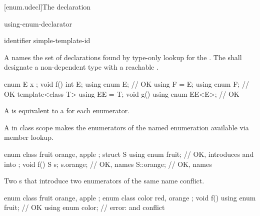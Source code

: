[enum.udecl]{The  declaration}%
%

\begin{bnf}
\br
      using-enum-declarator \terminal{;}
\end{bnf}

\begin{bnf}
\br
     identifier\br
     simple-template-id
\end{bnf}

\pnum
A 
names the set of declarations found by
type-only lookup
for the .
The 
shall designate a non-dependent type
with a reachable .
\begin{example}
\begin{codeblock}
enum E { x };
void f() {
  int E;
  using enum E;                 // OK
}
using F = E;
using enum F;                   // OK
template<class T> using EE = T;
void g() {
  using enum EE<E>;             // OK
}
\end{codeblock}
\end{example}

\pnum
A 
is equivalent to a  for each enumerator.

\pnum
\begin{note}
A  in class scope
makes the enumerators of the named enumeration available via member lookup.
\begin{example}
\begin{codeblock}
enum class fruit { orange, apple };
struct S {
  using enum fruit;             // OK, introduces  and  into 
};
void f() {
  S s;
  s.orange;                     // OK, names 
  S::orange;                    // OK, names 
}
\end{codeblock}
\end{example}
\end{note}

\pnum
\begin{note}
Two s
that introduce two enumerators of the same name conflict.
\begin{example}
\begin{codeblock}
enum class fruit { orange, apple };
enum class color { red, orange };
void f() {
  using enum fruit;             // OK
  using enum color;             // error:  and  conflict
}
\end{codeblock}
\end{example}
\end{note}


